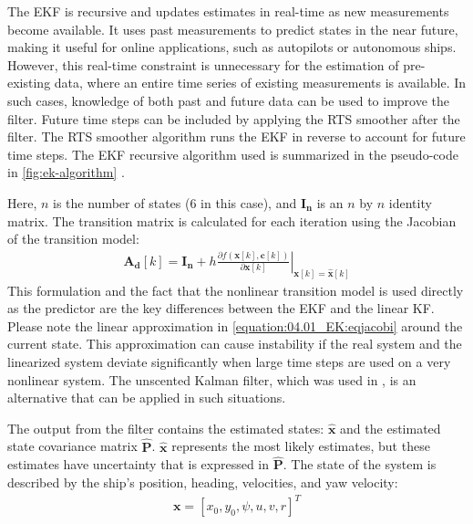 The EKF is recursive and updates estimates in real-time as new measurements become available. It uses past measurements to predict states in the near future, making it useful for online applications, such as autopilots or autonomous ships. However, this real-time constraint is unnecessary for the estimation of pre-existing data, where an entire time series of existing measurements is available. In such cases, knowledge of both past and future data can be used to improve the filter. Future time steps can be included by applying the RTS smoother after the filter. The RTS smoother algorithm runs the EKF in reverse to account for future time steps. The EKF recursive algorithm used is summarized in the pseudo-code in \autoref{fig:ek-algorithm} \cite{brownIntroductionRandomSignals1997}.
\clearpage

Here, \(n\) is the number of states (6 in this case), and \(\mathbf{I_n}\) is an $n$ by $n$ identity matrix.
The transition matrix is calculated for each iteration using the Jacobian of the transition model:
\begin{equation}\label{equation:04.01_EK:eqjacobi}
\begin{split}\mathbf{A_d}[k] = \mathbf{I_n} + h \left. \frac{\partial f \left(\mathbf{x}[k],\mathbf{c}[k] \right)}{\partial \mathbf{x}[k]} \right|_{\mathbf{x}[k]=\mathbf{\hat{x}}[k]}\end{split}
\end{equation}
This formulation and the fact that the nonlinear transition model is used directly as the predictor are the key differences between the EKF and the linear KF. Please note the linear approximation in \autoref{equation:04.01_EK:eqjacobi} around the current state. This approximation can cause instability if the real system and the linearized system deviate significantly when large time steps are used on a very nonlinear system. The unscented Kalman filter, which was used in \textcite{revestidoherreroTwostepIdentificationNonlinear2012}, is an alternative that can be applied in such situations.

The output from the filter contains the estimated states: \(\mathbf{\hat{x}}\) and the estimated state covariance matrix \(\mathbf{\hat{P}}\). \(\mathbf{\hat{x}}\) represents the most likely estimates, but these estimates have uncertainty that is expressed in \(\mathbf{\hat{P}}\).
The state of the system is described by the ship's position, heading, velocities, and yaw velocity:
\begin{equation}\label{equation:04.01_EK:eqstates}
\begin{split}\mathbf{x} = [x_0,y_0,\psi,u,v,r]^T\end{split}
\end{equation}


